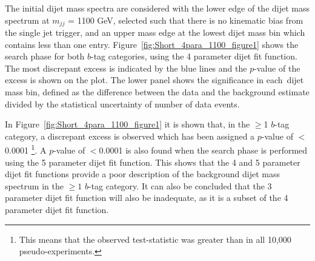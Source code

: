 The initial dijet mass spectra are considered with the lower edge of the dijet mass spectrum at $m_{jj}$ = 1100 GeV,
selected such that there is no kinematic bias from the single jet trigger,
and an upper mass edge at the lowest dijet mass bin which contains less than one entry.
Figure~\ref{fig:Short_4para_1100_figure1} shows the search phase
for both $b$-tag categories, using the 4 parameter dijet fit function.
The most discrepant excess is indicated by the blue lines and the \bh{} \mbox{$p$-value} of the excess is shown on the plot.
The lower panel shows the significance in each~dijet mass bin,
defined as the difference between the data and the background estimate divided by the statistical uncertainty of number of data events.

\vfill
\newpage
In Figure~\ref{fig:Short_4para_1100_figure1} it is shown that, in the $\geq$1 $b$-tag category,
a discrepant excess is observed which has been assigned a \bh{} \mbox{$p$-value} of $<$0.0001
\footnote{This means that the observed \bh{} test-statistic was greater than in all 10,000 pseudo-experiments.}.
A \bh{} \mbox{$p$-value} of $<$0.0001 is also found when the search phase is performed using the 5 parameter dijet fit function.
This shows that the 4 and 5 parameter dijet fit functions provide a poor description
of the background dijet mass spectrum in the $\geq1$ $b$-tag category.
It can also be concluded that the 3 parameter dijet fit function will also be inadequate, as it is a subset of the 4 parameter dijet fit function.

